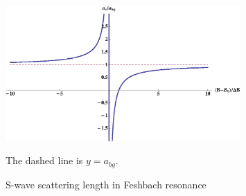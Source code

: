 \begin{figure}[htbp]
\begin{center}
\includegraphics[width=0.8\textwidth]{FeshbachAs}
\caption{S-wave scattering length in Feshbach resonance} 
\label{fig:intro:Feshbach}
{\small The dashed line is $y=a_{bg}$.}
\end{center}
\end{figure}

